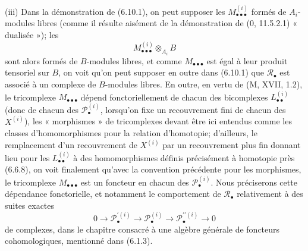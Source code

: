 \begin{remarks}[6.10.3]
\medskip
{}
\textnormal{(iii)} Dans la démonstration de (6.10.1), on peut supposer les
$M_{\bullet\bullet\bullet}^{(i)}$ formés de $A_i$-modules libres (comme il
résulte aisément de la démonstration de (0, 11.5.2.1) « dualisée »); les
\[
  M_{\bullet\bullet\bullet}^{(i)}\otimes_{A_i}B
\]
sont alors formés de $B$-modules libres, et comme
$M_{\bullet\bullet\bullet}$ est égal à leur produit tensoriel sur $B$, on voit
qu'on peut supposer en outre dans (6.10.1) que $\mathscr R_\bullet$ est associé
à un complexe de $B$-modules libres. En outre, en vertu de (M, XVII, 1.2), le
tricomplexe $M_{\bullet\bullet\bullet}$ dépend fonctoriellement de chacun des
bicomplexes $L_{\bullet\bullet}^{(i)}$ (donc de chacun des
$\mathscr P_\bullet^{(i)}$, lorsqu'on fixe un recouvrement fini de chacun des
$X^{(i)}$), les « morphismes » de tricomplexes devant être ici entendus comme
les classes d'homomorphismes pour la relation d'homotopie; d'ailleurs, le
remplacement d'un recouvrement de $X^{(i)}$ par un recouvrement plus fin
donnant lieu pour les $L_{\bullet\bullet}^{(i)}$ à des homomorphismes définis
précisément à homotopie près (6.6.8), on voit finalement qu'avec la convention
précédente pour les morphismes, le tricomplexe
$M_{\bullet\bullet\bullet}$ est un foncteur en chacun des
$\mathscr P_\bullet^{(i)}$. Nous préciserons cette dépendance fonctorielle, et
notamment le comportement de $\mathscr R_\bullet$ relativement à des suites
exactes
\[
  0\longrightarrow\mathscr P_\bullet^{\prime(i)}
  \longrightarrow\mathscr P_\bullet^{(i)}
  \longrightarrow\mathscr P_\bullet^{\prime\prime(i)}
  \longrightarrow0
\]
de complexes, dans le chapitre consacré à une algèbre générale de foncteurs
cohomologiques, mentionné dans (6.1.3).
\end{remarks}

